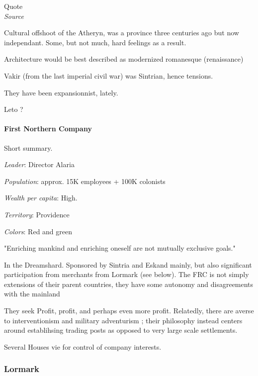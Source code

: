 \begin{rpg-quotebox}
    Quote \\ \textendash \textit{Source}
    \end{rpg-quotebox}


Cultural offshoot of the Atheryn, was a province three centuries ago but now independant. Some, but not much, hard feelings as a result.

Architecture would be best described as modernized romanesque (renaissance)

Vakir (from the last imperial civil war) was Sintrian, hence tensions.

They have been expansionnist, lately.


Leto ?



\paragraph{First Northern Company}


Short summary.

\textit{Leader}: Director Alaria

\textit{Population}: approx. 15K employees + 100K colonists

\textit{Wealth per capita}: High.

\textit{Territory}: Providence
    
\textit{Colors}: Red and green


\begin{rpg-quotebox}
"Enriching mankind and enriching oneself are not mutually exclusive goals."
\end{rpg-quotebox}


In the Dreamshard. Sponsored by Sintria and Eskand mainly, but also significant participation from merchants from Lormark (see below).  
The FRC is not simply extensions of their parent countries, they have some autonomy and disagreements with the mainland


They seek Profit, profit, and perhaps even more profit. Relatedly, there are averse to interventionism and military adventurism ; their philosophy instead centers around establihsing trading posts as opposed to very large scale settlements.

Several Houses vie for control of company interests.



\subsubsection{Lormark}

